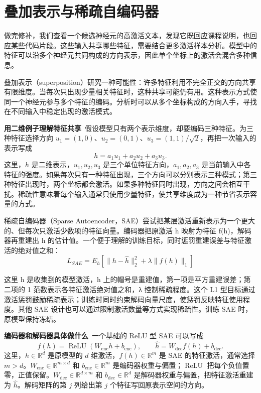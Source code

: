 \section{叠加表示与稀疏自编码器}\label{叠加表示与稀疏自编码器}

做完修补，我们查看一个候选神经元的高激活文本，发现它既回应课程说明，也回应某些代码片段。这些输入共享哪些特征，需要结合更多激活样本分析。模型中的特征可以沿多个神经元共同构成的方向表示，因此单个坐标上的激活会混合多种信息。

叠加表示（superposition）研究一种可能性：许多特征利用不完全正交的方向共享有限维度。当每次只出现少量相关特征时，这种共享可能仍有用。这种表示方式使同一个神经元参与多个特征的编码。分析时可以从多个坐标构成的方向入手，寻找在不同输入中稳定出现的激活模式。

\textbf{用二维例子理解特征共享}~假设模型只有两个表示维度，却要编码三种特征。为三种特征选择方向 $u_1=(1,0)$、$u_2=(0,1)$、$u_3=(1,1)/\sqrt2$，再把一次输入的表示写成
\[
h=a_1u_1+a_2u_2+a_3u_3.
\]
这里，$h$ 是二维表示，$u_1,u_2,u_3$ 是三个单位特征方向，$a_1,a_2,a_3$ 是当前输入中各特征的强度。如果每次只有一种特征出现，三个方向可以分别表示三种模式；第三种特征出现时，两个坐标都会激活。如果多种特征同时出现，方向之间会相互干扰。稀疏性意味着每个输入通常只使用少量特征，使共享维度成为一种节省表示容量的方式。

稀疏自编码器（Sparse Autoencoder，SAE）尝试把某层激活重新表示为一个更大的、但每次只激活少数项的特征向量。编码器把原激活 h 映射为特征 f(h)，解码器再重建出 h 的估计值。一个便于理解的训练目标，同时惩罚重建误差与特征激活的绝对值之和：
\[L_{SAE} = E_{h}\left\lbrack \lVert h-\widehat h\rVert_2^2 + \lambda \parallel f(h) \parallel_{1} \right\rbrack\]

这里 h 是收集到的模型激活，h 上的帽号是重建值，第一项是平方重建误差；第二项的 1 范数表示各特征激活绝对值之和，λ 控制稀疏程度。这个 L1 型目标通过激活惩罚鼓励稀疏表示；训练时同时约束解码向量尺度，使惩罚反映特征使用程度。其他 SAE 设计也可以通过限制激活数量等方式实现稀疏性。训练 SAE 时，原模型保持冻结。

\textbf{编码器和解码器具体做什么}~一个基础的 ReLU 型 SAE 可以写成
\[
f(h)=\operatorname{ReLU}(W_{\mathrm{enc}}h+b_{\mathrm{enc}}),
\qquad \widehat h=W_{\mathrm{dec}}f(h)+b_{\mathrm{dec}}.
\]
这里，$h\in\mathbb R^d$ 是原模型的 $d$ 维激活，$f(h)\in\mathbb R^m$ 是 SAE 的特征激活，通常选择 $m>d$。$W_{\mathrm{enc}}\in\mathbb R^{m\times d}$ 和 $b_{\mathrm{enc}}\in\mathbb R^m$ 是编码器权重与偏置；$\operatorname{ReLU}$ 把每个负值置零，正值保留。$W_{\mathrm{dec}}\in\mathbb R^{d\times m}$ 和 $b_{\mathrm{dec}}\in\mathbb R^d$ 是解码器权重与偏置，把特征激活重建为 $\widehat h$。解码矩阵的第 $j$ 列给出第 $j$ 个特征写回原表示空间的方向。

